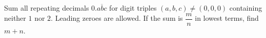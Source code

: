 Sum all repeating decimals $0.\overline{abc}$ for digit triples $(a,b,c)\ne(0,0,0)$ containing neither $1$ nor $2$. Leading zeroes are allowed. If the sum is $\dfrac{m}{n}$ in lowest terms, find $m+n$.
